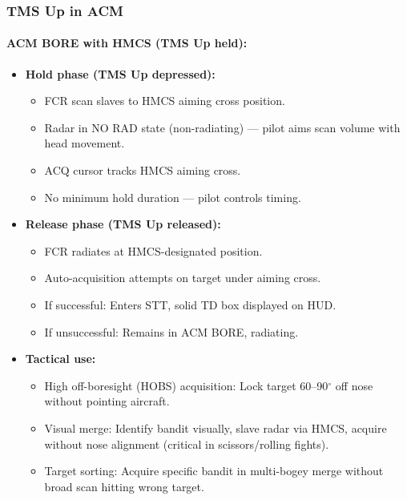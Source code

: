 \documentclass[11pt, a4paper, twoside]{report}
\begin{document}
\subsubsection*{TMS Up in ACM}
\label{sec:C4-S3-S4-S1}

\paragraph{ACM BORE with HMCS (TMS Up held):}
\begin{itemize}[nosep]
    \item \textbf{Hold phase (TMS Up depressed):}
    \begin{itemize}[nosep]
        \item FCR scan slaves to HMCS aiming cross position.
        \item Radar in NO RAD state (non-radiating) --- pilot aims scan volume with head movement.
        \item ACQ cursor tracks HMCS aiming cross.
        \item No minimum hold duration --- pilot controls timing.
    \end{itemize}
    
    \item \textbf{Release phase (TMS Up released):}
    \begin{itemize}[nosep]
        \item FCR radiates at HMCS-designated position.
        \item Auto-acquisition attempts on target under aiming cross.
        \item If successful: Enters STT, solid TD box displayed on HUD.
        \item If unsuccessful: Remains in ACM BORE, radiating.
    \end{itemize}
    
    \item \textbf{Tactical use:}
    \begin{itemize}[nosep]
        \item High off-boresight (HOBS) acquisition: Lock target 60--90$^\circ$ off nose without 
              pointing aircraft.
        \item Visual merge: Identify bandit visually, slave radar via HMCS, acquire without 
              nose alignment (critical in scissors/rolling fights).
        \item Target sorting: Acquire specific bandit in multi-bogey merge without broad 
              scan hitting wrong target.
    \end{itemize}
\end{itemize}
\end{document}
